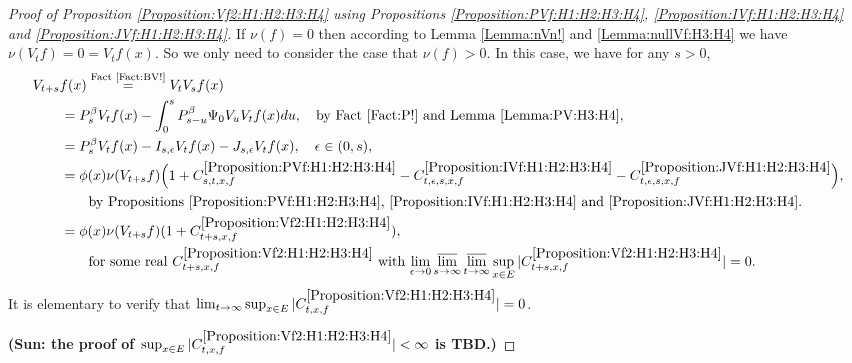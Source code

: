 \documentclass[12pt,a4paper]{amsart}
\numberwithin{equation}{section}
\theoremstyle{plain}
\theoremstyle{definition}
\theoremstyle{remark}
\newcounter{N}
\newcounter{n}[N]
\begin{document}
\begin{proof}[{Proof of Proposition \ref{Proposition:Vf2:H1:H2:H3:H4} using Propositions \ref{Proposition:PVf:H1:H2:H3:H4}, \ref{Proposition:IVf:H1:H2:H3:H4} and \ref{Proposition:JVf:H1:H2:H3:H4}}]
If $\nu(f)=0$ then according to Lemma \ref{Lemma:nVn!} and \ref{Lemma:nullVf:H3:H4} we have $\nu(V_tf) =0= V_tf(x)$. 
So we only need to consider the case that $\nu(f)>0$.
In this case, we have for any $s>0$,
\begin{align}
 \MoveEqLeft V_{t+s}f (x)
	\overset{\text{Fact \ref{Fact:BV!}}}= V_t V_s f(x)
 \\&= P_s^\beta V_t f(x) - \int_0^s P^\beta_{s-u}\Psi_0 V_uV_t f(x) du, \quad\text{by Fact \ref{Fact:P!} and Lemma \ref{Lemma:PV:H3:H4}},
 \\&= P_s^\beta V_t f(x) - I_{s,\epsilon} V_tf(x) - J_{s,\epsilon} V_t f(x), \quad \epsilon\in (0,s),
 \\&=\phi(x)\nu(V_{t+s}f) \Big( 1+ C^{\ref{Proposition:PVf:H1:H2:H3:H4}}_{s,t,x,f} - C^{\ref{Proposition:IVf:H1:H2:H3:H4}}_{t,\epsilon, s, x,f}- C^{\ref{Proposition:JVf:H1:H2:H3:H4}}_{t,\epsilon,s,x,f}\Big), 
 \\&\qquad \text{by Propositions \ref{Proposition:PVf:H1:H2:H3:H4}, \ref{Proposition:IVf:H1:H2:H3:H4} and \ref{Proposition:JVf:H1:H2:H3:H4}}.
 \\& = \phi(x) \nu(V_{t+s}f) (1+ C^{\ref{Proposition:Vf2:H1:H2:H3:H4}}_{t+s,x,f}),
 \\& \qquad \text{for some real $C^{\ref{Proposition:Vf2:H1:H2:H3:H4}}_{t+s,x,f}$ with $\lim_{\epsilon \to 0}\varlimsup_{s\to \infty}\varlimsup_{t\to \infty}\sup_{x\in E}|C^{\ref{Proposition:Vf2:H1:H2:H3:H4}}_{t+s,x,f}|=0$}.
 \end{align}
It is elementary to verify that $\lim_{t\to \infty} \sup_{x\in E}|C^{\ref{Proposition:Vf2:H1:H2:H3:H4}}_{t,x,f}|=0$.

{\bf (Sun: the proof  of $\sup_{x\in E}|C_{t,x,f}^{\ref{Proposition:Vf2:H1:H2:H3:H4}}| < \infty$ is TBD.)}
\end{proof}
\end{document}
